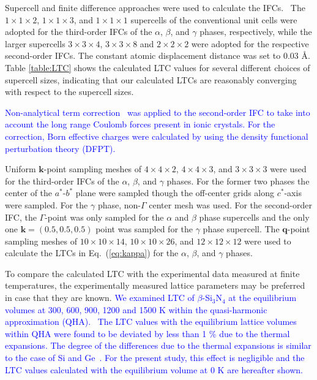 \documentclass[twocolumn,amsmath,amssymb,a4paper,prb,superscriptaddress,floatfix]{revtex4-1}
\begin{document}
Supercell and finite difference approaches were used to calculate the
IFCs.~\cite{wei-supercell} The $1\times 1\times2$, $1\times 1\times3$, and
$1\times 1\times1$ supercells of the conventional unit cells were adopted for
the third-order IFCs of the $\alpha$, $\beta$, and $\gamma$ phases,
respectively, while the larger supercells $3\times 3\times4$, $3\times
3\times8$ and $2\times 2\times2$ were adopted for the respective second-order
IFCs.  The constant atomic displacement distance was set to 0.03 \AA.  Table
\ref{table:LTC} shows the calculated LTC values for several different choices
of supercell sizes, indicating that our calculated LTCs are reasonably
converging with respect to the supercell sizes. 

\textcolor{blue}{Non-analytical term correction~\cite{wang} was applied to the
second-order IFC to take into account the long range Coulomb forces present in
ionic crystals. For the correction, Born effective charges were calculated by
using the density functional perturbation theory (DFPT).}

Uniform $\mathbf{k}$-point sampling meshes of $4\times 4\times 2$,
$4\times 4\times 3$, and $3\times 3\times 3$ were used for the
third-order IFCs of the $\alpha$, $\beta$, and $\gamma$ phases. For the
former two phases the center of the $a^*$-$b^*$ plane were sampled
though the off-center grids along $c^*$-axis were sampled. For the
$\gamma$ phase, non-$\Gamma$ center mesh was used. For the second-order
IFC, the $\Gamma$-point was only sampled for the $\alpha$ and $\beta$
phase supercells and the only one $\mathbf{k}=(0.5, 0.5, 0.5)$ point was
sampled for the $\gamma$ phase supercell. The $\mathbf{q}$-point
sampling meshes of $10\times 10\times 14$, $10\times 10\times 26$, and
$12\times 12\times 12$ were used to calculate the LTCs in Eq.~(\ref{eq:kappa})
for the $\alpha$, $\beta$, and $\gamma$ phases.

To compare the calculated LTC with the experimental data measured at finite
temperatures, the experimentally measured lattice parameters may be preferred
in case that they are known. \textcolor{blue}{We examined LTC of $\beta$-Si$_3$N$_4$ at the
equilibrium volumes at 300, 600, 900, 1200 and 1500 K within the quasi-harmonic
approximation (QHA).~\cite{dove-p76} The LTC values with the equilibrium
lattice volumes within QHA were found to be deviated by less than 1 \% due to
the thermal expansions. The degree of the differences due to the thermal
expansions is similar to the case of Si and Ge~\cite{ward-ltc}. For the present
study, this effect is negligible and the LTC values calculated with the
equilibrium volume at 0 K are hereafter shown.}
\end{document}

